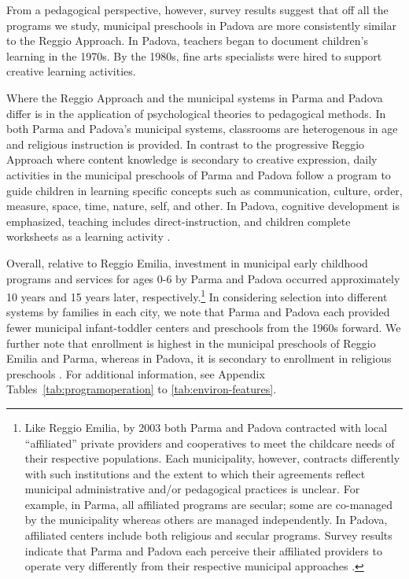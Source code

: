 From a pedagogical perspective, however, survey results suggest that off all the programs we study, municipal preschools in Padova are more consistently similar to the Reggio Approach. In Padova, teachers began to document children's learning in the 1970s. By the 1980s, fine arts specialists were hired to support creative learning activities.

Where the Reggio Approach and the municipal systems in Parma and Padova differ is in the application of psychological theories to pedagogical methods. In both Parma and Padova's municipal systems, classrooms are heterogenous in age and religious instruction is provided. In contrast to the progressive Reggio Approach where content knowledge is secondary to creative expression, daily activities in the municipal preschools of Parma and Padova follow a program to guide children in learning specific concepts such as communication, culture, order, measure, space, time, nature, self, and other. In Padova, cognitive development is emphasized, teaching includes direct-instruction, and children complete worksheets as a learning activity \citep{CEHD_2016_Historical-Analysis}.

Overall, relative to Reggio Emilia, investment in municipal early childhood programs and services for ages 0-6 by Parma and Padova occurred approximately 10 years and 15 years later, respectively.\footnote{Like Reggio Emilia, by 2003 both Parma and Padova contracted with local ``affiliated'' private providers and cooperatives to meet the childcare needs of their respective populations. Each municipality, however, contracts differently with such institutions and the extent to which their agreements reflect municipal administrative and/or pedagogical practices is unclear. For example, in Parma, all affiliated programs are secular; some are co-managed by the municipality whereas others are managed independently. In Padova, affiliated centers include both religious and secular programs. Survey results indicate that Parma and Padova each perceive their affiliated providers to operate very differently from their respective municipal approaches \citep{CEHD_2016_Historical-Analysis}.} In considering selection into different systems by families in each city, we note that Parma and Padova each provided fewer municipal infant-toddler centers and preschools from the 1960s forward. We further note that enrollment is highest in the municipal preschools of Reggio Emilia and Parma, whereas in Padova, it is secondary to enrollment in religious preschools \citep{Padova-Admin-Data_1964-2011,Reggio-Admin-data_1966-2006,Reggio-Annual-Journals_1994-2011}. For additional information, see Appendix Tables~\ref{tab:programoperation} to \ref{tab:environ-features}.

